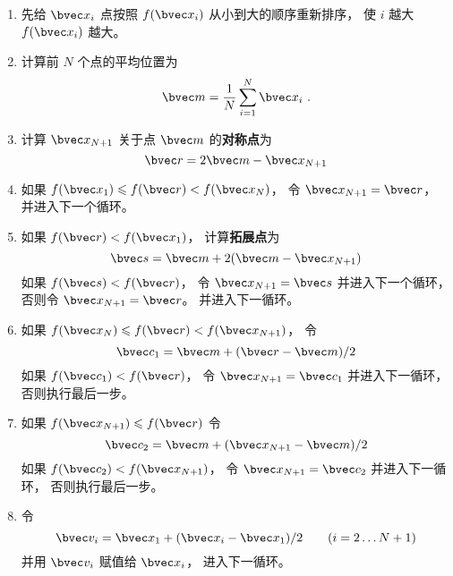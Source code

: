 \begin{enumerate}
\item 先给 $\bvec x_i$ 点按照 $f(\bvec x_i)$ 从小到大的顺序重新排序， 使 $i$ 越大 $f(\bvec x_i)$ 越大。

\item 计算前 $N$ 个点的平均位置为
\begin{equation}
\bvec m = \frac1N \sum_{i=1}^N \bvec x_i~.
\end{equation}

\item 计算 $\bvec x_{N + 1}$ 关于点 $\bvec m$ 的\textbf{对称点}为
\begin{equation}
\bvec r = 2\bvec m - \bvec x_{N + 1}
\end{equation}

\item 如果 $f(\bvec x_1) \leqslant f(\bvec r) < f(\bvec x_N)$， 令 $\bvec x_{N+1} = \bvec r$， 并进入下一个循环。

\item 如果 $f(\bvec r) < f(\bvec x_1)$， 计算\textbf{拓展点}为
\begin{equation}
\bvec s = \bvec m + 2(\bvec m - \bvec x_{N+1})
\end{equation}
如果 $f(\bvec s) < f(\bvec r)$， 令 $\bvec x_{N+1} = \bvec s$ 并进入下一个循环， 否则令 $\bvec x_{N+1} = \bvec r$。 并进入下一循环。

\item 如果 $f(\bvec x_N) \leqslant f(\bvec r) < f(\bvec x_{N+1})$， 令
\begin{equation}
\bvec c_1 = \bvec m + (\bvec r - \bvec m)/2
\end{equation}
如果 $f(\bvec c_1) < f(\bvec r)$， 令 $\bvec x_{N + 1} = \bvec c_1$ 并进入下一循环， 否则执行最后一步。

\item 如果 $f(\bvec x_{N+1}) \leqslant f(\bvec r)$ 令
\begin{equation}
\bvec c_2 = \bvec m + (\bvec x_{N+1} - \bvec m)/2
\end{equation}
如果 $f(\bvec c_2) < f(\bvec x_{N+1})$， 令 $\bvec x_{N+1}  = \bvec c_2$ 并进入下一循环， 否则执行最后一步。

\item 令
\begin{equation}
\bvec v_i = \bvec x_1 + (\bvec x_i - \bvec x_1)/2 \qquad (i = 2\dots N+1)
\end{equation}
并用 $\bvec v_i$ 赋值给 $\bvec x_i$， 进入下一循环。
\end{enumerate}

